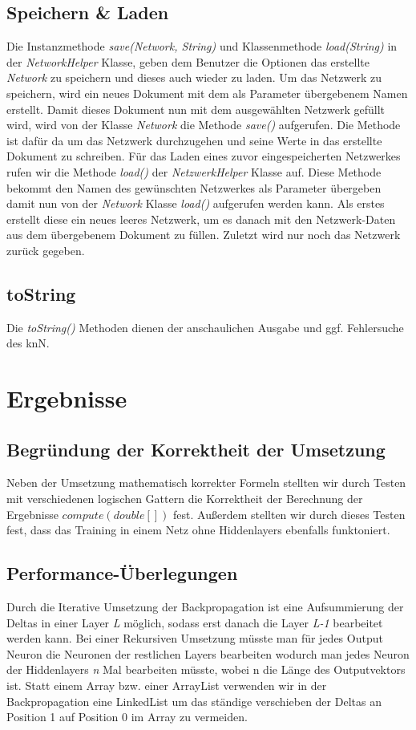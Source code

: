 \documentclass[paper=A4,pagesize=auto,12pt,headinclude=true,footinclude=true,BCOR=0mm,DIV=calc]{scrartcl}
\begin{document}
\subsection{Speichern \& Laden}
Die Instanzmethode \textit{save(Network, String)} und Klassenmethode \textit{load(String)} in der \textit{NetworkHelper} Klasse, geben dem Benutzer die Optionen das erstellte \textit{Network} zu speichern und dieses auch wieder zu laden.
Um das Netzwerk zu speichern, wird ein neues Dokument mit dem als Parameter übergebenem Namen erstellt. Damit dieses Dokument nun mit dem ausgewählten Netzwerk gefüllt wird, wird von der Klasse \textit{Network} die Methode \textit{save()} aufgerufen. Die Methode ist dafür da um das Netzwerk durchzugehen und seine Werte in das
erstellte Dokument zu schreiben. Für das Laden eines zuvor eingespeicherten Netzwerkes rufen wir die Methode \textit{load()} der \textit{NetzwerkHelper} Klasse auf. Diese Methode bekommt den Namen des gewünschten Netzwerkes als Parameter übergeben damit nun von der \textit{Network} Klasse \textit{load()} aufgerufen werden kann. Als erstes erstellt diese ein neues leeres Netzwerk, um es danach mit den Netzwerk-Daten aus dem übergebenem Dokument zu füllen. Zuletzt wird nur noch das Netzwerk zurück gegeben.


\subsection{toString}
Die \textit{toString()} Methoden dienen der anschaulichen Ausgabe und ggf. Fehlersuche des knN. 

\newpage

\section{Ergebnisse}

\subsection{Begründung der Korrektheit der Umsetzung}
Neben der Umsetzung mathematisch korrekter Formeln stellten wir durch Testen mit verschiedenen logischen Gattern die Korrektheit der Berechnung der Ergebnisse \(compute (double[])\) fest.
Außerdem stellten wir durch dieses Testen fest, dass das Training in einem Netz ohne Hiddenlayers ebenfalls funktoniert.

\subsection{Performance-Überlegungen}
Durch die Iterative Umsetzung der Backpropagation ist eine Aufsummierung der Deltas in einer Layer \textit{L} möglich, sodass erst danach die Layer \textit{L-1} bearbeitet werden kann.
Bei einer Rekursiven Umsetzung müsste man für jedes Output Neuron die Neuronen der restlichen Layers bearbeiten wodurch man jedes Neuron der Hiddenlayers \textit{n} Mal bearbeiten müsste, wobei n die Länge des Outputvektors ist.
Statt einem Array bzw. einer ArrayList verwenden wir in der Backpropagation eine LinkedList um das ständige verschieben der Deltas an Position 1 auf Position 0 im Array zu vermeiden.
\end{document}
